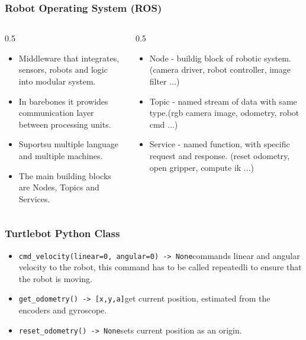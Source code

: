 \documentclass{beamer}
\begin{document}
\begin{frame}
  \frametitle{Robot Operating System (ROS)}
  \begin{columns}
    \begin{column}{0.5\textwidth}
      \begin{itemize}
      \item Middleware that integrates, sensors, robots and logic into modular system.
      \item In barebones it prowides communication layer between processing units.
      \item Suportsu multiple language and multiple machines.
      \item The main building blocks are Nodes, Topics and Services.
      \end{itemize}
    \end{column}
    \begin{column}{0.5\textwidth}
      \begin{itemize}
      \item Node - buildig block of robotic system. (camera driver, robot controller, image filter ...)
      \item Topic - named stream of data with same type.(rgb camera image, odometry, robot cmd ...)
      \item Service - named function, with specific request and response. (reset odometry, open gripper, compute ik ...)
      \end{itemize}
    \end{column}
  \end{columns}
\end{frame}


\begin{frame}[fragile]
  \frametitle{Turtlebot Python Class}
  \begin{itemize}
  \item
    \verb|cmd_velocity(linear=0, angular=0) -> None|\break commands linear and angular velocity to the robot, this command has to be called repeatedli to ensure that the robot is moving.
  \item
    \verb|get_odometry() -> [x,y,a]|\break get current position, estimated from the encoders and gyroscope.
  \item
    \verb|reset_odometry() -> None|\break sets current position as an origin.
  \end{itemize}
\end{frame}
\end{document}
